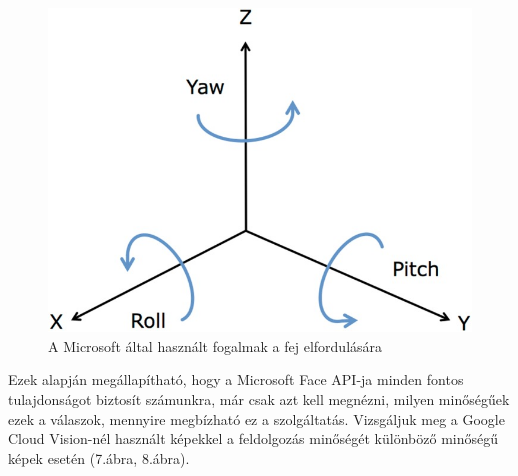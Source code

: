 \begin{figure}[h]
\centering
  \includegraphics[scale=2]{img/roll_yaw_pitch}
    \caption{A Microsoft által használt fogalmak a fej elfordulására \cite{roll_yaw_pitch}}
\end{figure}

Ezek alapján megállapítható, hogy a Microsoft Face API-ja minden fontos tulajdonságot biztosít számunkra, már csak azt kell megnézni, milyen minőségűek ezek a válaszok, mennyire megbízható ez a szolgáltatás. Vizsgáljuk meg a Google Cloud Vision-nél használt képekkel a feldolgozás minőségét különböző minőségű képek esetén  (7.ábra, 8.ábra).

